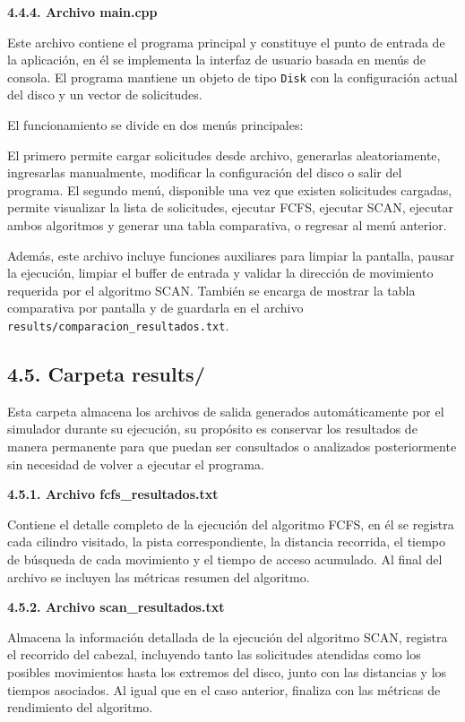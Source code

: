 \documentclass[14pt,letterpaper]{extarticle}
\begin{document}
\vfill
\textbf{4.4.4. Archivo main.cpp}

Este archivo contiene el programa principal y constituye el punto de entrada de la aplicación, en él se implementa la interfaz de usuario basada en menús de consola. El programa mantiene un objeto de tipo \texttt{Disk} con la configuración actual del disco y un vector de solicitudes.

El funcionamiento se divide en dos menús principales:

El primero permite cargar solicitudes desde archivo, generarlas aleatoriamente, ingresarlas manualmente, modificar la configuración del disco o salir del programa. El segundo menú, disponible una vez que existen solicitudes cargadas, permite visualizar la lista de solicitudes, ejecutar FCFS, ejecutar SCAN, ejecutar ambos algoritmos y generar una tabla comparativa, o regresar al menú anterior.

Además, este archivo incluye funciones auxiliares para limpiar la pantalla, pausar la ejecución, limpiar el buffer de entrada y validar la dirección de movimiento requerida por el algoritmo SCAN. También se encarga de mostrar la tabla comparativa por pantalla y de guardarla en el archivo \texttt{results/comparacion\_resultados.txt}.

\subsection*{4.5. Carpeta results/}

Esta carpeta almacena los archivos de salida generados automáticamente por el simulador durante su ejecución, su propósito es conservar los resultados de manera permanente para que puedan ser consultados o analizados posteriormente sin necesidad de volver a ejecutar el programa.

\textbf{4.5.1. Archivo fcfs\_resultados.txt}

Contiene el detalle completo de la ejecución del algoritmo FCFS, en él se registra cada cilindro visitado, la pista correspondiente, la distancia recorrida, el tiempo de búsqueda de cada movimiento y el tiempo de acceso acumulado. Al final del archivo se incluyen las métricas resumen del algoritmo.

\textbf{4.5.2. Archivo scan\_resultados.txt}

Almacena la información detallada de la ejecución del algoritmo SCAN, registra el recorrido del cabezal, incluyendo tanto las solicitudes atendidas como los posibles movimientos hasta los extremos del disco, junto con las distancias y los tiempos asociados. Al igual que en el caso anterior, finaliza con las métricas de rendimiento del algoritmo.
\end{document}
